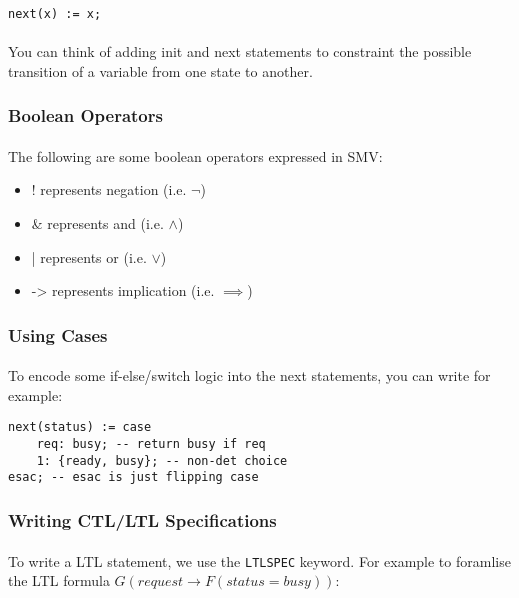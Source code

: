 \documentclass{article}
\theoremstyle{plain}
\theoremstyle{definition}
\begin{document}
\begin{multicols}{2}
\begin{lstlisting}
next(x) := x;
\end{lstlisting}

\paragraph{} You can think of adding init and next statements to constraint the possible transition of a variable from one state to another.

\subsubsection{Boolean Operators}

\paragraph{} The following are some boolean operators expressed in SMV:

\begin{itemize}
\item ! represents negation (i.e. $\lnot$)
\item \& represents and (i.e. $\land$)
\item | represents or (i.e. $\lor$)
\item -> represents implication (i.e. $\implies$)
\end{itemize}

\subsubsection{Using Cases}

\paragraph{} To encode some if-else/switch logic into the next statements, you can write for example:

\begin{lstlisting}
next(status) := case
	req: busy; -- return busy if req
	1: {ready, busy}; -- non-det choice
esac; -- esac is just flipping case
\end{lstlisting}

\subsubsection{Writing CTL/LTL Specifications}

\paragraph{} To write a LTL statement, we use the \lstinline{LTLSPEC} keyword. For example to foramlise the LTL formula $G(request \rightarrow F(status = busy))$:


\end{multicols}
\end{document}
